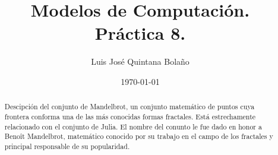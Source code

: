 \documentclass[a4paper]{article}
\title{Modelos de Computación.\\ Práctica 8. }
\author{Luis José Quintana Bolaño}
\date{\today}
\begin{document}
	\maketitle
	\begin{abstract}
	    Descipción del conjunto de Mandelbrot, un conjunto matemático de puntos cuya frontera conforma una de las más conocidas formas fractales. Está estrechamente relacionado con el conjunto de Julia. El nombre del conunto le fue dado en honor a Benoît Mandelbrot, matemático conocido por su trabajo en el campo de los fractales y principal responsable de su popularidad.
  	\end{abstract}
	\section{}
		
\end{document}
